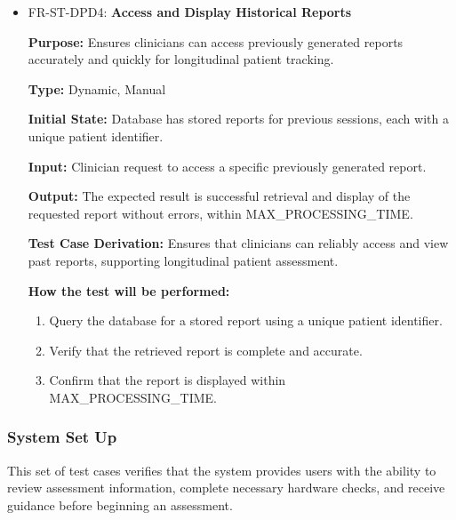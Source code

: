 \documentclass[12pt, titlepage]{article}
\begin{document}
\begin{itemize}
  \item FR-ST-DPD4: \textbf{Access and Display Historical Reports}
  \begin{mdframed}[linewidth=0.5mm]
      \textbf{Purpose:} Ensures clinicians can access previously generated reports accurately and quickly for longitudinal patient tracking. \par
      \textbf{Type:} Dynamic, Manual \par
      \textbf{Initial State:} Database has stored reports for previous sessions, each with a unique patient identifier. \par
      \textbf{Input:} Clinician request to access a specific previously generated report. \par
      \textbf{Output:} The expected result is successful retrieval and display of the requested report without errors, within MAX\_PROCESSING\_TIME. \par
      \textbf{Test Case Derivation:} Ensures that clinicians can reliably access and view past reports, supporting longitudinal patient assessment. \par
      \textbf{How the test will be performed:}
      \begin{enumerate}[noitemsep]
        \item Query the database for a stored report using a unique patient identifier.
        \item Verify that the retrieved report is complete and accurate.
        \item Confirm that the report is displayed within MAX\_PROCESSING\_TIME.
      \end{enumerate}
  \end{mdframed}
\end{itemize}

\subsubsection{System Set Up}

\hspace{2em}This set of test cases verifies that the system provides users with the ability to 
review assessment information, complete necessary hardware checks, and receive guidance before beginning an assessment.
\end{document}
